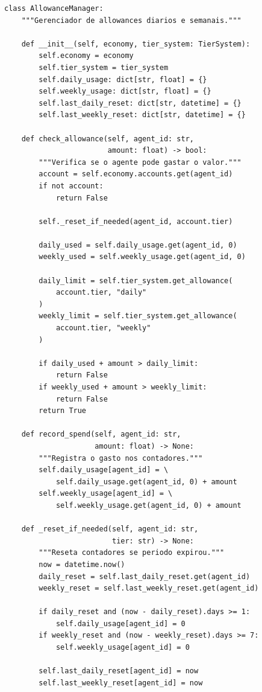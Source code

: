 \begin{lstlisting}[caption={Gerenciador de allowances},label={lst:allowance}]
class AllowanceManager:
    """Gerenciador de allowances diarios e semanais."""

    def __init__(self, economy, tier_system: TierSystem):
        self.economy = economy
        self.tier_system = tier_system
        self.daily_usage: dict[str, float] = {}
        self.weekly_usage: dict[str, float] = {}
        self.last_daily_reset: dict[str, datetime] = {}
        self.last_weekly_reset: dict[str, datetime] = {}

    def check_allowance(self, agent_id: str,
                        amount: float) -> bool:
        """Verifica se o agente pode gastar o valor."""
        account = self.economy.accounts.get(agent_id)
        if not account:
            return False

        self._reset_if_needed(agent_id, account.tier)

        daily_used = self.daily_usage.get(agent_id, 0)
        weekly_used = self.weekly_usage.get(agent_id, 0)

        daily_limit = self.tier_system.get_allowance(
            account.tier, "daily"
        )
        weekly_limit = self.tier_system.get_allowance(
            account.tier, "weekly"
        )

        if daily_used + amount > daily_limit:
            return False
        if weekly_used + amount > weekly_limit:
            return False
        return True

    def record_spend(self, agent_id: str,
                     amount: float) -> None:
        """Registra o gasto nos contadores."""
        self.daily_usage[agent_id] = \
            self.daily_usage.get(agent_id, 0) + amount
        self.weekly_usage[agent_id] = \
            self.weekly_usage.get(agent_id, 0) + amount

    def _reset_if_needed(self, agent_id: str,
                         tier: str) -> None:
        """Reseta contadores se periodo expirou."""
        now = datetime.now()
        daily_reset = self.last_daily_reset.get(agent_id)
        weekly_reset = self.last_weekly_reset.get(agent_id)

        if daily_reset and (now - daily_reset).days >= 1:
            self.daily_usage[agent_id] = 0
        if weekly_reset and (now - weekly_reset).days >= 7:
            self.weekly_usage[agent_id] = 0

        self.last_daily_reset[agent_id] = now
        self.last_weekly_reset[agent_id] = now
\end{lstlisting}

